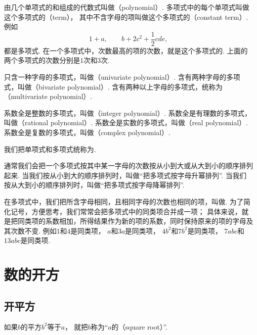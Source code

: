 由几个单项式的和组成的代数式叫做（polynomial）.
多项式中的每个单项式叫做这个多项式的（term），
其中不含字母的项叫做这个多项式的（constant term）.
例如\begin{equation*}
	1+a, \qquad
	b+2c^2+\frac12cde,
\end{equation*}都是多项式.
在一个多项式中，次数最高的项的次数，就是这个多项式的.
上面的两个多项式的次数分别是\(1\)次和\(3\)次.

只含一种字母的多项式，叫做（univariate polynomial）.
含有两种字母的多项式，叫做（bivariate polynomial）.
含有两种以上字母的多项式，统称为（multivariate polynomial）.

系数全是整数的多项式，叫做（integer polynomial）.
系数全是有理数的多项式，叫做（rational polynomial）.
系数全是实数的多项式，叫做（real polynomial）.
系数全是复数的多项式，叫做（complex polynomial）.

我们把单项式和多项式统称为.

通常我们会把一个多项式按其中某一字母的次数按从小到大或从大到小的顺序排列起来.
当我们按从小到大的顺序排列时，叫做“把多项式按字母升幂排列”.
当我们按从大到小的顺序排列时，叫做“把多项式按字母降幂排列”.

在多项式中，我们把所含字母相同，且相同字母的次数也相同的项，叫做.
为了简化记号，方便思考，我们常常会把多项式中的同类项合并成一项；
具体来说，就是把同类项的系数相加，所得结果作为新的项的系数，同时保持原来的项的字母及其次数不变.
例如\(1\)和\(4\)是同类项，
\(a\)和\(3a\)是同类项，
\(4b^2\)和\(7b^2\)是同类项，
\(7abc\)和\(13abc\)是同类项.

\section{数的开方}
\subsection{开平方}
如果\(b\)的平方\(b^2\)等于\(a\)，
就把\(b\)称为“\(a\)的（square root）”.

